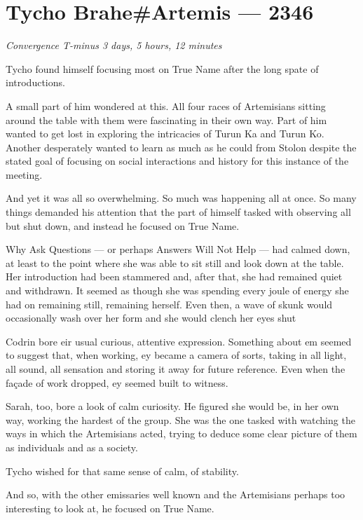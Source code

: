 \hypertarget{tycho-braheartemis-2346}{%
\chapter{Tycho Brahe\#Artemis — 2346}\label{tycho-braheartemis-2346}}

\begin{center}
\emph{Convergence T-minus 3 days, 5 hours, 12 minutes}
\end{center}

\noindent Tycho found himself focusing most on True Name after the long spate of introductions.

A small part of him wondered at this. All four races of Artemisians sitting around the table with them were fascinating in their own way. Part of him wanted to get lost in exploring the intricacies of Turun Ka and Turun Ko. Another desperately wanted to learn as much as he could from Stolon despite the stated goal of focusing on social interactions and history for this instance of the meeting.

And yet it was all so overwhelming. So much was happening all at once. So many things demanded his attention that the part of himself tasked with observing all but shut down, and instead he focused on True Name.

Why Ask Questions — or perhaps Answers Will Not Help — had calmed down, at least to the point where she was able to sit still and look down at the table. Her introduction had been stammered and, after that, she had remained quiet and withdrawn. It seemed as though she was spending every joule of energy she had on remaining still, remaining herself. Even then, a wave of skunk would occasionally wash over her form and she would clench her eyes shut

Codrin bore eir usual curious, attentive expression. Something about em seemed to suggest that, when working, ey became a camera of sorts, taking in all light, all sound, all sensation and storing it away for future reference. Even when the façade of work dropped, ey seemed built to witness.

Sarah, too, bore a look of calm curiosity. He figured she would be, in her own way, working the hardest of the group. She was the one tasked with watching the ways in which the Artemisians acted, trying to deduce some clear picture of them as individuals and as a society.

Tycho wished for that same sense of calm, of stability.

And so, with the other emissaries well known and the Artemisians perhaps too interesting to look at, he focused on True Name.

